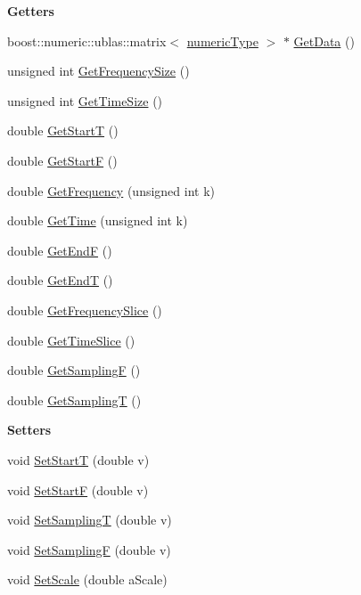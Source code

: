 \begin{Indent}\textbf{ Getters}\par
\begin{DoxyCompactItemize}
\item 
boost\+::numeric\+::ublas\+::matrix$<$ \hyperlink{classtsa_1_1_t_f_view_a9dcd740f5d29edefd0a181917a9c700b}{numeric\+Type} $>$ $\ast$ \hyperlink{classtsa_1_1_t_f_view_a4dbb5d10597478b8440429e1a9842eab}{Get\+Data} ()
\item 
unsigned int \hyperlink{classtsa_1_1_t_f_view_a7dcdf5430baeedfb3170f4dcfbf9cd09}{Get\+Frequency\+Size} ()
\item 
unsigned int \hyperlink{classtsa_1_1_t_f_view_ac8b74db7ad7e2aacd1d92b5da737ee3e}{Get\+Time\+Size} ()
\item 
double \hyperlink{classtsa_1_1_t_f_view_ad8f53724f34669fee2ee12d656c43d51}{Get\+StartT} ()
\item 
double \hyperlink{classtsa_1_1_t_f_view_acb07eb67f2ef12f13b4f91941bda15d5}{Get\+StartF} ()
\item 
double \hyperlink{classtsa_1_1_t_f_view_a13f50c0e460377632ccc771e196df064}{Get\+Frequency} (unsigned int k)
\item 
double \hyperlink{classtsa_1_1_t_f_view_ab5041c986c79f6daac52fa248ec050cf}{Get\+Time} (unsigned int k)
\item 
double \hyperlink{classtsa_1_1_t_f_view_a0dcfff88b1560da2c7999cce2d636fd7}{Get\+EndF} ()
\item 
double \hyperlink{classtsa_1_1_t_f_view_a61bc73548b5e9e568a5b5e692dfecde7}{Get\+EndT} ()
\item 
double \hyperlink{classtsa_1_1_t_f_view_abd84518db70471ee4dc9e1d19fd532ca}{Get\+Frequency\+Slice} ()
\item 
double \hyperlink{classtsa_1_1_t_f_view_adcf936687b668125c123aae1ae31bb94}{Get\+Time\+Slice} ()
\item 
double \hyperlink{classtsa_1_1_t_f_view_aca01f57f4015fa85e1b70e244d635eec}{Get\+SamplingF} ()
\item 
double \hyperlink{classtsa_1_1_t_f_view_a3f014481f5ed76c12a3ab831952e4e3d}{Get\+SamplingT} ()
\end{DoxyCompactItemize}
\end{Indent}
\begin{Indent}\textbf{ Setters}\par
\begin{DoxyCompactItemize}
\item 
void \hyperlink{classtsa_1_1_t_f_view_a19ae1d94585e16c5580d2459a30384a5}{Set\+StartT} (double v)
\item 
void \hyperlink{classtsa_1_1_t_f_view_a8a3ef3daaaab4d9836f32140079c747f}{Set\+StartF} (double v)
\item 
void \hyperlink{classtsa_1_1_t_f_view_a1f77299b852922b33ffae367df01988c}{Set\+SamplingT} (double v)
\item 
void \hyperlink{classtsa_1_1_t_f_view_abb1df435da547728dbb1ff762c3a38be}{Set\+SamplingF} (double v)
\item 
void \hyperlink{classtsa_1_1_t_f_view_a4926dbef93856a5b642c83ad6c60a178}{Set\+Scale} (double a\+Scale)
\end{DoxyCompactItemize}
\end{Indent}

